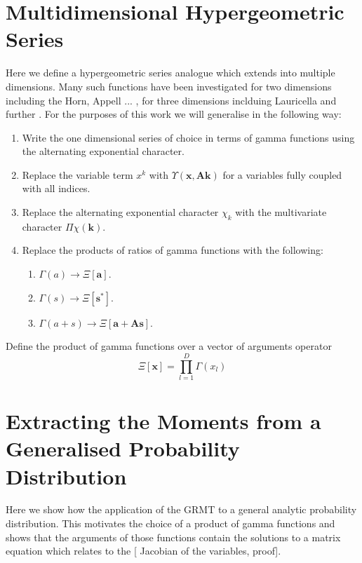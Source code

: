 \documentclass[journal=jcisd8,manuscript=article,layout=onecolumn,pdftex,floatfix,amsmath,amssymb,10pt]{achemso}
\begin{document}
\section{Multidimensional Hypergeometric Series}
Here we define a hypergeometric series analogue which extends into multiple dimensions. Many such functions have been investigated for two dimensions including the Horn, Appell ... \cite{}, for three dimensions inclduing Lauricella \cite{} and further \cite{}. For the purposes of this work we will generalise in the following way:

\begin{enumerate}
\item Write the one dimensional series of choice in terms of gamma functions using the alternating exponential character.
\item Replace the variable term $x^k$ with $\Upsilon(\mathbf{x},\mathbf{A}\mathbf{k})$ for a variables fully coupled with all indices.
\item Replace the alternating exponential character $\chi_k$ with the multivariate character $\Pi\chi(\mathbf{k})$.
\item Replace the products of ratios of gamma functions with the following:
\begin{enumerate}
\item $\Gamma(a) \to \Xi[\mathbf{a}]$.
\item $\Gamma(s) \to \Xi[\mathbf{s}^*]$.
\item $\Gamma(a+s) \to \Xi[\mathbf{a}+\mathbf{A}\mathbf{s}]$.
\end{enumerate}
\end{enumerate}

Define the product of gamma functions over a vector of arguments operator
\begin{equation}
\Xi[\mathbf{x}] = \prod_{l=1}^D \Gamma(x_l)
\end{equation}


\section{Extracting the Moments from a Generalised Probability Distribution}
Here we show how the application of the GRMT to a general analytic probability distribution. This motivates the choice of a product of gamma functions and shows that the arguments of those functions contain the solutions to a matrix equation which relates to the [{\color{red} Jacobian of the variables}, proof].
\end{document}
